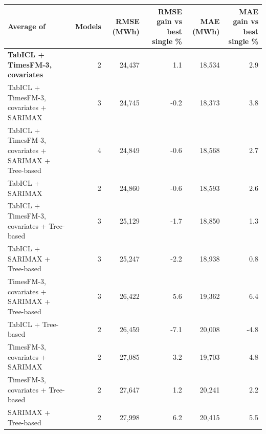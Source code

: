 \begin{tabular}{lrrrrr}
\toprule
Average of & Models & RMSE (MWh) & RMSE gain vs best single \% & MAE (MWh) & MAE gain vs best single \% \\
\midrule
\textbf{TabICL + TimesFM-3, covariates} & 2 & 24,437 & 1.1 & 18,534 & 2.9 \\
TabICL + TimesFM-3, covariates + SARIMAX & 3 & 24,745 & -0.2 & 18,373 & 3.8 \\
TabICL + TimesFM-3, covariates + SARIMAX + Tree-based & 4 & 24,849 & -0.6 & 18,568 & 2.7 \\
TabICL + SARIMAX & 2 & 24,860 & -0.6 & 18,593 & 2.6 \\
TabICL + TimesFM-3, covariates + Tree-based & 3 & 25,129 & -1.7 & 18,850 & 1.3 \\
TabICL + SARIMAX + Tree-based & 3 & 25,247 & -2.2 & 18,938 & 0.8 \\
TimesFM-3, covariates + SARIMAX + Tree-based & 3 & 26,422 & 5.6 & 19,362 & 6.4 \\
TabICL + Tree-based & 2 & 26,459 & -7.1 & 20,008 & -4.8 \\
TimesFM-3, covariates + SARIMAX & 2 & 27,085 & 3.2 & 19,703 & 4.8 \\
TimesFM-3, covariates + Tree-based & 2 & 27,647 & 1.2 & 20,241 & 2.2 \\
SARIMAX + Tree-based & 2 & 27,998 & 6.2 & 20,415 & 5.5 \\
\bottomrule
\end{tabular}
